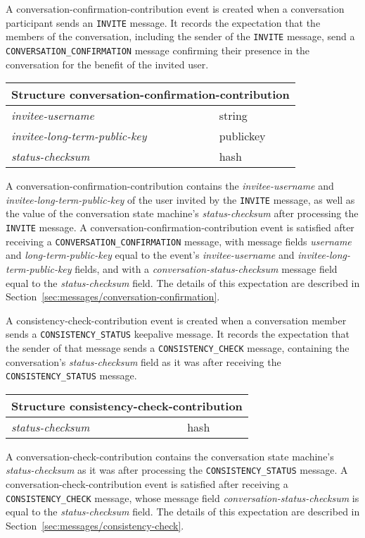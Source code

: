 \documentclass{article}
\def\npmessage#1{\texttt{#1}}
\def\field#1{\textit{#1}}
\def\smfield#1{\textsl{#1}}
\def\type#1{\textsf{#1}}
\newenvironment{struct}[1]{
\newcommand{\structfield}[2]{
\smfield{##1} & \type{##2} \\
\hline
}
\par
\vspace{-\medskipamount}
\hspace{2em minus 2em}\begin{tabular}{|l|l|}
\hline
\multicolumn{2}{|c|}{Structure \type{#1}} \\
\hline
\hline
}{
\end{tabular}
\vspace{-\medskipamount}
\par
}
\begin{document}
A \type{conversation-confirmation-contribution} event is created when a conversation participant sends an \npmessage{INVITE} message.
It records the expectation that the members of the conversation, including the sender of the \npmessage{INVITE} message, send a \npmessage{CONVERSATION\_CONFIRMATION} message confirming their presence in the conversation for the benefit of the invited user.
\begin{struct}{conversation-confirmation-contribution}
\structfield{invitee-username}{string}
\structfield{invitee-long-term-public-key}{publickey}
\structfield{status-checksum}{hash}
\end{struct}
A \type{conversation-confirmation-contribution} contains the \smfield{invitee-username} and \smfield{invitee-long-term-public-key} of the user invited by the \npmessage{INVITE} message, as well as the value of the conversation state machine's \smfield{status-checksum} after processing the \npmessage{INVITE} message.
A \type{conversation-confirmation-contribution} event is satisfied after receiving a \npmessage{CONVERSATION\_CONFIRMATION} message, with message fields \field{username} and \field{long-term-public-key} equal to the event's \smfield{invitee-username} and \smfield{invitee-long-term-public-key} fields, and with a \field{conversation-status-checksum} message field equal to the \smfield{status-checksum} field.
The details of this expectation are described in Section~\ref{sec:messages/conversation-confirmation}.

A \type{consistency-check-contribution} event is created when a conversation member sends a \npmessage{CONSISTENCY\_STATUS} keepalive message.
It records the expectation that the sender of that message sends a \npmessage{CONSISTENCY\_CHECK} message, containing the conversation's \smfield{status-checksum} field as it was after receiving the \npmessage{CONSISTENCY\_STATUS} message.
\begin{struct}{consistency-check-contribution}
\structfield{status-checksum}{hash}
\end{struct}
A \type{conversation-check-contribution} contains the conversation state machine's \smfield{status-checksum} as it was after processing the \npmessage{CONSISTENCY\_STATUS} message.
A \type{conversation-check-contribution} event is satisfied after receiving a \npmessage{CONSISTENCY\_CHECK} message, whose message field \field{conversation-status-checksum} is equal to the \smfield{status-checksum} field.
The details of this expectation are described in Section~\ref{sec:messages/consistency-check}.
\end{document}
